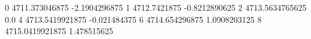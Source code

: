 0 4711.373046875 -2.1904296875
1 4712.7421875 -0.8212890625
2 4713.5634765625 0.0
4 4713.5419921875 -0.021484375
6 4714.654296875 1.0908203125
8 4715.0419921875 1.478515625
